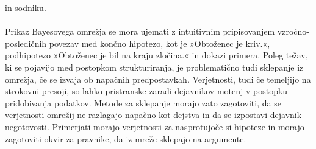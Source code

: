 \documentclass[12pt,a4paper]{amsart}
\theoremstyle{definition} %
\theoremstyle{plain} %
\begin{document}
in sodniku.\\\\
Prikaz Bayesovega omrežja se mora ujemati z intuitivnim pripisovanjem vzročno-posledičnih povezav med končno hipotezo, kot je »Obtoženec je kriv.«, podhipotezo
»Obtoženec je bil na kraju zločina.« in dokazi primera. Poleg težav, ki se pojavijo med postopkom strukturiranja, je problematično tudi sklepanje
iz omrežja, če se izvaja ob napačnih predpostavkah. Verjetnosti, tudi če temeljijo na strokovni presoji, so lahko pristranske zaradi dejavnikov
motenj v postopku pridobivanja podatkov. Metode za sklepanje morajo zato zagotoviti, da se verjetnosti omrežij ne razlagajo napačno kot dejstva in
da se izpostavi dejavnik negotovosti. Primerjati morajo verjetnosti za nasprotujoče si hipoteze in morajo zagotoviti okvir za pravnike, da iz
mreže sklepajo na argumente.

\end{document}
